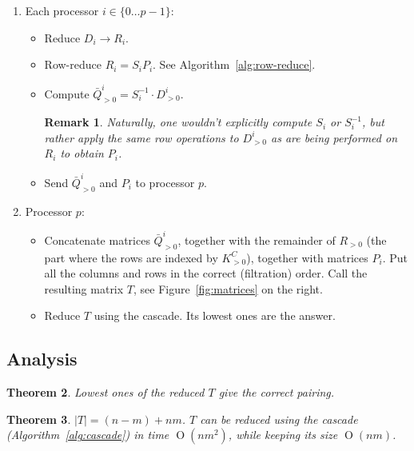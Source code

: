 \documentclass{article}
\newcommand{\bigO}  {\operatorname{O}}
\newtheorem{theorem}            {Theorem}
\newtheorem{remark}[theorem]    {Remark}
\begin{document}
\begin{enumerate}
    \item
        Each processor $i \in \{ 0 \ldots p-1 \}$:
        \begin{itemize}
            \item Reduce        $D_i \to R_i$.
            \item Row-reduce    $R_i = S_i P_i$.
                  See Algorithm~\ref{alg:row-reduce}.
            \item Compute       $\bar{Q}^i_{>0} = S^{-1}_i \cdot D^i_{>0}$.
                \begin{remark}
                    Naturally, one wouldn't explicitly compute $S_i$ or
                    $S^{-1}_i$, but rather apply the same row operations to
                    $D^i_{>0}$ as are being performed on $R_i$ to obtain $P_i$. \\
                \end{remark}
            \item Send $\bar{Q}^i_{>0}$ and $P_i$ to processor $p$.
        \end{itemize}

    \item
        Processor $p$:
        \begin{itemize}
            \item
                Concatenate matrices $\bar{Q}^i_{>0}$, together with the remainder of
                $R_{>0}$ (the part where the rows are indexed by $K^C_{>0}$),
                together with matrices $P_i$.
                Put all the columns and rows in the correct (filtration) order.
                Call the resulting matrix $T$, see Figure~\ref{fig:matrices} on
                the right.
            \item Reduce $T$ using the cascade. Its lowest ones are the answer.
        \end{itemize}
\end{enumerate}

\subsection{Analysis}

\begin{theorem}
    Lowest ones of the reduced $T$ give the correct pairing.
\end{theorem}

\begin{theorem}
    $|T| = (n-m) + nm$. $T$ can be reduced using the cascade
    (Algorithm~\ref{alg:cascade}) in time $\bigO(n m^2)$,
    while keeping its size $\bigO(nm)$.
\end{theorem}
\end{document}
